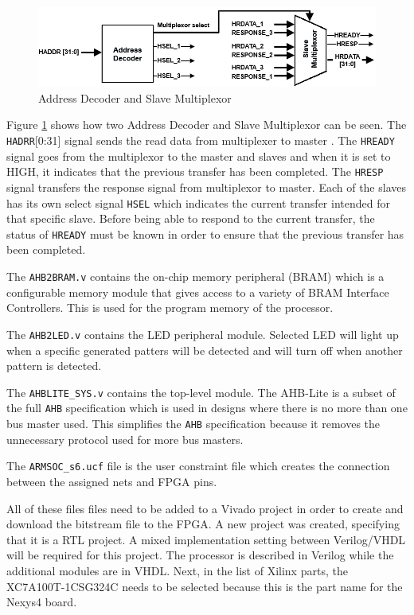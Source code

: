\begin{figure}
\centering
\includegraphics[scale=0.7]{figures/decoder_and_multiplexer.PNG}
\caption{Address Decoder and Slave Multiplexor\cite{ahblite} } 
\label{fig:decoder_multiplexer}
\end{figure}

Figure \ref{fig:decoder_multiplexer} shows how two Address Decoder and Slave Multiplexor can be seen. The \verb|HADRR|[0:31] signal sends the read data from multiplexer to master \cite{ahblite}. The \verb|HREADY| signal goes from the multiplexor to the master and slaves and when it is set to HIGH, it indicates that the previous transfer has been completed. The \verb|HRESP| signal transfers the response signal from multiplexor to master. Each of the slaves has its own select signal \verb|HSEL| which indicates the current transfer intended for that specific slave. Before being able to respond to the current transfer, the status of \verb|HREADY| must be known in order to ensure that the previous transfer has been completed. 

The \verb|AHB2BRAM.v| contains the on-chip memory peripheral (BRAM) 
which is a configurable memory module that gives access to a variety of BRAM Interface Controllers. This is used for the program memory of the processor.

The \verb|AHB2LED.v| contains the LED peripheral module. Selected LED will light up when a specific generated patters will be detected and will turn off when another pattern is detected.

The \verb|AHBLITE_SYS.v| contains the top-level module. The AHB-Lite is a subset of the full \verb|AHB| specification which is used in designs where there is no more than one bus master used. This simplifies the \verb|AHB| specification because it removes the unnecessary protocol used for more bus masters.

The \verb|ARMSOC_s6.ucf| file is the user constraint file which creates the connection between the assigned nets and FPGA pins.

All of these files files need to be added to a Vivado project in order to create and download the bitstream file to the FPGA. A new project was created, specifying that it is a RTL project. A mixed implementation setting between Verilog/VHDL will be required for this project. The processor is described in Verilog while the additional modules are in VHDL. Next, in the list of Xilinx parts, the XC7A100T-1CSG324C needs to be selected because this is the part name for the Nexys4 board. 

